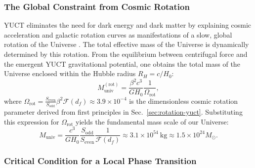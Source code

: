 \documentclass[12pt,a4paper]{article}
\begin{document}
	\subsubsection{The Global Constraint from Cosmic Rotation}
	
	YUCT eliminates the need for dark energy and dark matter by explaining cosmic acceleration and galactic rotation curves as manifestations of a slow, global rotation of the Universe \cite{AppendixΩ}. The total effective mass of the Universe is dynamically determined by this rotation. From the equilibrium between centrifugal force and the emergent YUCT gravitational potential, one obtains the total mass of the Universe enclosed within the Hubble radius \(R_H = c/H_0\):
	\begin{equation}
		M_{\mathrm{univ}}^{\mathrm{(rot)}} = \frac{\beta^2 c^3}{G H_0} \frac{1}{\Omega_{\mathrm{rot}}},
	\end{equation}
	where \(\Omega_{\mathrm{rot}} = \frac{S_{\mathrm{even}}}{S_{\mathrm{odd}}} \beta^2 \mathcal{F}(d_f) \approx 3.9 \times 10^{-4}\) is the dimensionless cosmic rotation parameter derived from first principles in Sec.~\ref{sec:rotation-yuct}. Substituting this expression for \(\Omega_{\mathrm{rot}}\) yields the fundamental mass scale of our Universe:
	\begin{equation}
		M_{\mathrm{univ}} = \frac{c^3}{G H_0} \frac{S_{\mathrm{odd}}}{S_{\mathrm{even}}} \frac{1}{\mathcal{F}(d_f)} \approx 3.1 \times 10^{54}\ \mathrm{kg} \approx 1.5 \times 10^{24} M_{\odot}.
	\end{equation}
	
	\subsubsection{Critical Condition for a Local Phase Transition}
	
\end{document}
